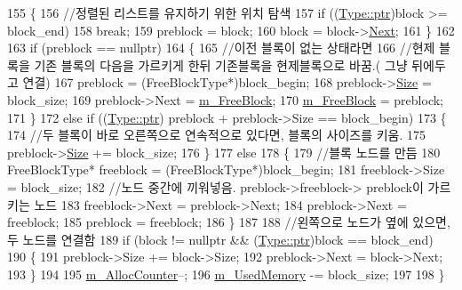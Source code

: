 \begin{DoxyCode}
155     \{
156         \textcolor{comment}{//정렬된 리스트를 유지하기 위한 위치 탐색}
157         \textcolor{keywordflow}{if} ((\hyperlink{namespace_comet_engine_1_1_type_aeb22ad46de677e9a50679dfebeb0e6f0}{Type::ptr})block >= block\_end)
158             \textcolor{keywordflow}{break};
159         preblock = block;
160         block = block->\hyperlink{struct_comet_engine_1_1_core_1_1_memory_1_1_free_list_allocator_1_1_free_block_type_a85617a85510a3465dbae6a061308aef7}{Next};
161     \}
162 
163     \textcolor{keywordflow}{if} (preblock == \textcolor{keyword}{nullptr})
164     \{
165         \textcolor{comment}{//이전 블록이 없는 상태라면 }
166         \textcolor{comment}{//현제 블록을 기존 블록의 다음을 가르키게 한뒤 기존블록을 현제블록으로 바꿈.( 그냥 뒤에두고 연결)}
167         preblock = (FreeBlockType*)block\_begin;
168         preblock->\hyperlink{struct_comet_engine_1_1_core_1_1_memory_1_1_free_list_allocator_1_1_free_block_type_ae6cf85bdf7b52a990d4428449e599c8e}{Size} = block\_size;
169         preblock->Next = \hyperlink{class_comet_engine_1_1_core_1_1_memory_1_1_free_list_allocator_a9e6f8b10d6e94738d154d9f7c72d2538}{m\_FreeBlock};
170         \hyperlink{class_comet_engine_1_1_core_1_1_memory_1_1_free_list_allocator_a9e6f8b10d6e94738d154d9f7c72d2538}{m\_FreeBlock} = preblock;
171     \}
172     \textcolor{keywordflow}{else} \textcolor{keywordflow}{if} ((\hyperlink{namespace_comet_engine_1_1_type_aeb22ad46de677e9a50679dfebeb0e6f0}{Type::ptr}) preblock + preblock->Size == block\_begin)
173     \{
174         \textcolor{comment}{//두 블록이 바로 오른쪽으로 연속적으로 있다면, 블록의 사이즈를 키움.}
175         preblock->\hyperlink{struct_comet_engine_1_1_core_1_1_memory_1_1_free_list_allocator_1_1_free_block_type_ae6cf85bdf7b52a990d4428449e599c8e}{Size} += block\_size;
176     \}
177     \textcolor{keywordflow}{else}
178     \{
179         \textcolor{comment}{//블록 노드를 만듬}
180         FreeBlockType* freeblock = (FreeBlockType*)block\_begin;
181         freeblock->Size = block\_size;
182         \textcolor{comment}{//노드 중간에 끼워넣음. preblock->freeblock-> preblock이 가르키는 노드}
183         freeblock->Next = preblock->Next;
184         preblock->Next = freeblock;
185         preblock = freeblock;
186     \}
187 
188     \textcolor{comment}{//왼쪽으로 노드가 옆에 있으면, 두 노드를 연결함}
189     \textcolor{keywordflow}{if} (block != \textcolor{keyword}{nullptr} && (\hyperlink{namespace_comet_engine_1_1_type_aeb22ad46de677e9a50679dfebeb0e6f0}{Type::ptr})block == block\_end)
190     \{
191         preblock->Size += block->Size;
192         preblock->Next = block->Next;
193     \}
194 
195     \hyperlink{class_comet_engine_1_1_core_1_1_memory_1_1_base_allocator_abed7f06b465ee178701fe2cfc1aff9a6}{m\_AllocCounter}--;
196     \hyperlink{class_comet_engine_1_1_core_1_1_memory_1_1_base_allocator_a1420047b91508f9ab33c448e8371511c}{m\_UsedMemory} -= block\_size;
197 
198 \}
\end{DoxyCode}
